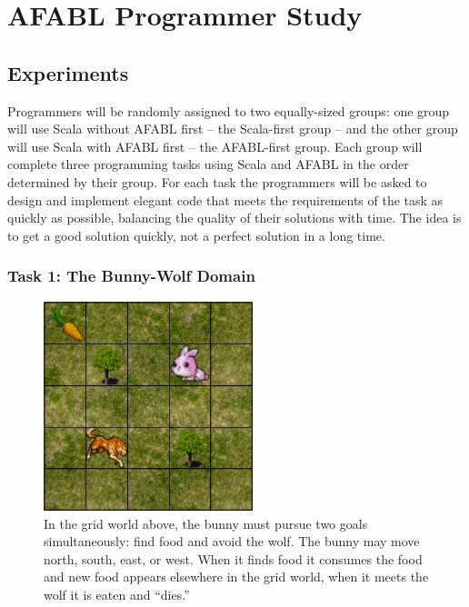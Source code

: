\chapter{AFABL Programmer Study}\label{ch:programmer-study}

\section{Experiments}

Programmers will be randomly assigned to two equally-sized groups: one group will use Scala without AFABL first -- the Scala-first group -- and the other group will use Scala with AFABL first -- the AFABL-first group.  Each group will complete three programming tasks using Scala and AFABL in the order determined by their group.  For each task the programmers will be asked to design and implement elegant code that meets the requirements of the task as quickly as possible, balancing the quality of their solutions with time.  The idea is to get a good solution quickly, not a perfect solution in a long time.

\subsection{Task 1: The Bunny-Wolf Domain}\label{sec:task1}

\begin{figure}[h]

\begin{center}
\includegraphics[height=2.4in]{bunny.png}
\end{center}


\caption{In the grid world above, the bunny must pursue two goals
  simultaneously: find food and avoid the wolf.  The bunny may move
  north, south, east, or west.  When it finds food it consumes the
  food and new food appears elsewhere in the grid world, when it meets
  the wolf it is eaten and ``dies.''}
\label{fig:bunny-picture}
\end{figure}

